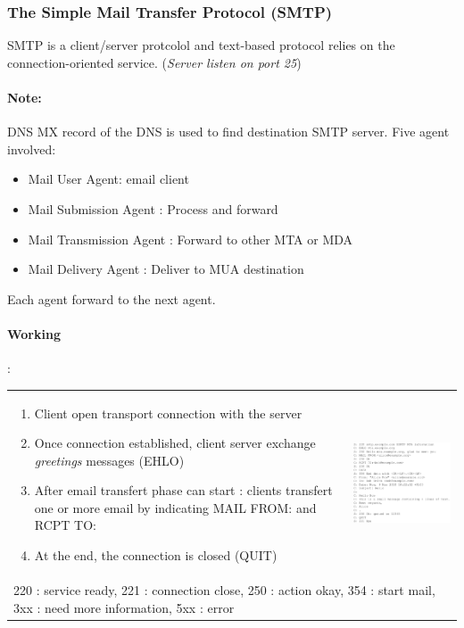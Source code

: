 \subsubsection{The Simple Mail Transfer Protocol (SMTP)}

SMTP is a client/server protcolol and text-based protocol relies on the
connection-oriented service. (\textit{Server listen on port 25})
\paragraph{Note:} DNS MX record of the DNS is used to find destination SMTP server.
Five agent involved:
\begin{multicols}{2}
	\begin{itemize}
		\item Mail User Agent: email client
		\item Mail Submission Agent : Process and forward
		\item Mail Transmission Agent : Forward to other MTA or MDA
		\item Mail Delivery Agent : Deliver to MUA destination
	\end{itemize}
\end{multicols}
Each agent forward to the next agent.
\paragraph{Working} :

\begin{tabular}{m{9cm}m{6cm}}
\begin{enumerate}
    \item Client open transport connection with the server
    \item Once connection established, client server exchange \textit{greetings}
        messages (\textsc{EHLO}) 
    \item After email transfert phase can start : clients transfert one or more email 
        by indicating \textsc{MAIL FROM:} and \textsc{RCPT TO:}
    \item At the end, the connection is closed (QUIT)
\end{enumerate}
&
\includegraphics[width=7cm]{stmp.png} \\
\multicolumn{2}{m{15cm}}{220 : service ready, 221 : connection close, 250 : action okay, 354 : start mail, 3xx : need more information, 5xx : error}
\end{tabular}

